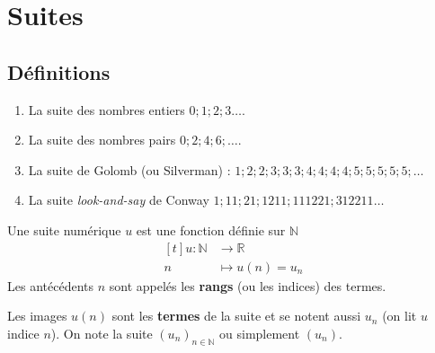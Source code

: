 \documentclass[main.tex]{subfiles}
\begin{document}
 
\newpage 
{}  
\pagestyle{scrheadings} %
\onehalfspacing 
\setcounter{chapter}{4}
\chapter{Suites}  
\section{Définitions}
\begin{example}\hfill
	\begin{enumerate}[label=\textbullet,leftmargin=*]
		\item La suite des nombres entiers $0; 1 ; 2 ; 3 \ldots$.
		\item La suite des nombres pairs $0; 2; 4; 6 ;\ldots$.
		\item La suite de Golomb (ou Silverman) : $1;2;2;3;3;3;4;4;4;4;5;5;5;5;5;\ldots$
		\item La suite \emph{look-and-say} de Conway $1;11;21;1211;111221;312211\ldots$
	\end{enumerate}
\end{example}  
\begin{definition} 
	Une suite numérique $u$ est une fonction définie sur $\mathbb{N}$ 
	\setlength{\abovedisplayskip}{3pt}
	\setlength{\belowdisplayskip}{3pt}
	$$\begin{aligned}[t]
		u : \mathbb{N} & \rightarrow \mathbb{R}   	\\
		n & \mapsto u(n)=u_n
		\end{aligned}
	$$
\noindent	Les antécédents $n$ sont appelés les \textbf{rangs} (ou les indices) des termes.

\noindent	Les images $u(n)$ sont  les \textbf{termes} de la suite et se notent aussi $u_n$ (on lit \og $u$ indice $n$\fg{}). 
\noindent	On note la suite $(u_n)_{n\in\mathbb{N}}$ ou simplement $(u_n)$.
\end{definition}  
\end{document}
